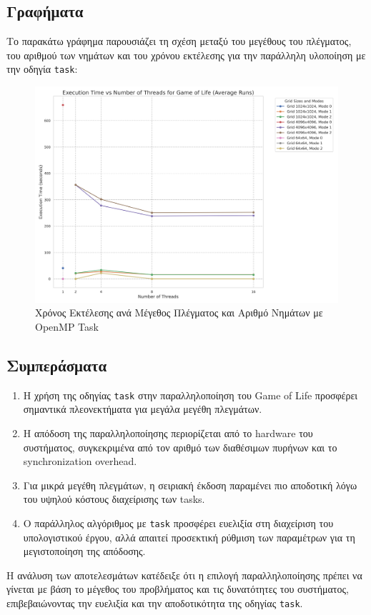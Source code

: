 \documentclass{article}
\begin{document}
\subsection*{Γραφήματα} 
Το παρακάτω γράφημα παρουσιάζει τη σχέση μεταξύ του μεγέθους του πλέγματος, του αριθμού των νημάτων και του χρόνου εκτέλεσης για την παράλληλη υλοποίηση με την οδηγία \texttt{task}: 
\begin{figure}[h] 
    \centering 
    \includegraphics[width=1\textwidth]{game_of_life_tasks_results.png} 
    \caption{Χρόνος Εκτέλεσης ανά Μέγεθος Πλέγματος και Αριθμό Νημάτων με OpenMP Task} 
\end{figure}
\subsection*{Συμπεράσματα} 
\begin{enumerate} 
    \item Η χρήση της οδηγίας \texttt{task} στην παραλληλοποίηση του Game of Life προσφέρει σημαντικά πλεονεκτήματα για μεγάλα μεγέθη πλεγμάτων. 
    \item Η απόδοση της παραλληλοποίησης περιορίζεται από το hardware του συστήματος, συγκεκριμένα από τον αριθμό των διαθέσιμων πυρήνων και το synchronization overhead. 
    \item Για μικρά μεγέθη πλεγμάτων, η σειριακή έκδοση παραμένει πιο αποδοτική λόγω του υψηλού κόστους διαχείρισης των tasks. 
    \item Ο παράλληλος αλγόριθμος με \texttt{task} προσφέρει ευελιξία στη διαχείριση του υπολογιστικού έργου, αλλά απαιτεί προσεκτική ρύθμιση των παραμέτρων για τη μεγιστοποίηση της απόδοσης. 
\end{enumerate}
Η ανάλυση των αποτελεσμάτων κατέδειξε ότι η επιλογή παραλληλοποίησης πρέπει να γίνεται με βάση το μέγεθος του προβλήματος και τις δυνατότητες του συστήματος, επιβεβαιώνοντας την ευελιξία και την αποδοτικότητα της οδηγίας \texttt{task}.
\end{document}
